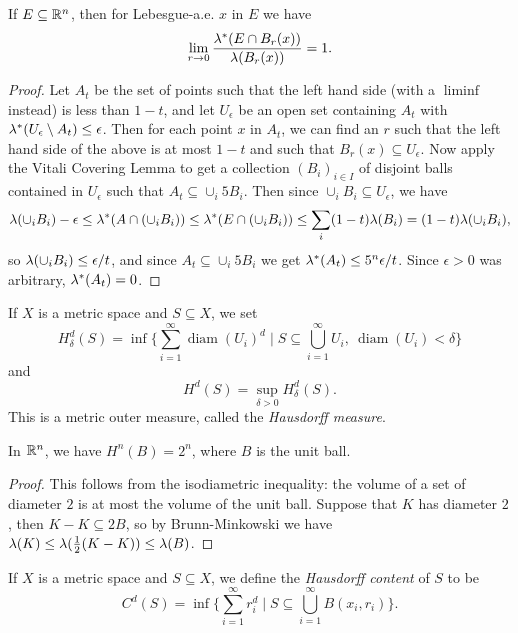 \documentclass[letterpaper,11pt]{report}
\DeclareMathOperator{\diam}{diam}
\begin{document}
\begin{thm}\label{lebesgue-density} If $E \subseteq \mathbb{R}^n$, then for Lebesgue-a.e. $x$ in $E$ we have
\[
\lim_{r \rightarrow 0} \frac{\lambda^*(E\cap B_r(x))}{\lambda(B_r(x))} = 1.
\]
\end{thm}
\begin{proof} Let $A_t$ be the set of points such that the left hand side (with a $\liminf$ instead) is less than $1-t$, and let $U_\epsilon$ be an open set containing $A_t$ with $\lambda^*(U_\epsilon \setminus A_t) \le \epsilon$. Then for each point $x$ in $A_t$, we can find an $r$ such that the left hand side of the above is at most $1-t$ and such that $B_r(x) \subseteq U_\epsilon$. Now apply the Vitali Covering Lemma to get a collection $(B_i)_{i \in I}$ of disjoint balls contained in $U_\epsilon$ such that $A_t \subseteq \cup_i 5B_i$. Then since $\cup_i B_i \subseteq U_\epsilon$, we have
\[
\lambda(\cup_i B_i)-\epsilon \le \lambda^*(A \cap (\cup_i B_i)) \le \lambda^*(E\cap (\cup_i B_i)) \le \sum_i (1-t)\lambda(B_i) = (1-t)\lambda(\cup_i B_i),
\]
so $\lambda(\cup_i B_i) \le \epsilon/t$, and since $A_t \subseteq \cup_i 5B_i$ we get $\lambda^*(A_t) \le 5^n\epsilon/t$. Since $\epsilon > 0$ was arbitrary, $\lambda^*(A_t) = 0$.
\end{proof}

\begin{defn} If $X$ is a metric space and $S \subseteq X$, we set
\[
H^d_\delta(S) = \inf\Big\{\sum_{i=1}^\infty \diam(U_i)^d \mid S \subseteq \bigcup_{i=1}^\infty U_i,\ \diam(U_i) < \delta\Big\}
\]
and
\[
H^d(S) = \sup_{\delta > 0} H^d_\delta(S).
\]
This is a metric outer measure, called the \emph{Hausdorff measure}.
\end{defn}

\begin{thm} In $\mathbb{R}^n$, we have $H^n(B) = 2^n$, where $B$ is the unit ball.
\end{thm}
\begin{proof} This follows from the isodiametric inequality: the volume of a set of diameter $2$ is at most the volume of the unit ball. Suppose that $K$ has diameter $2$, then $K-K \subseteq 2B$, so by Brunn-Minkowski we have $\lambda(K) \le \lambda(\frac{1}{2}(K-K)) \le \lambda(B)$.
\end{proof}

\begin{defn} If $X$ is a metric space and $S \subseteq X$, we define the \emph{Hausdorff content} of $S$ to be
\[
C^d(S) = \inf\Big\{\sum_{i=1}^\infty r_i^d \mid S \subseteq \bigcup_{i=1}^\infty B(x_i,r_i)\Big\}.
\]
\end{defn}
\end{document}
